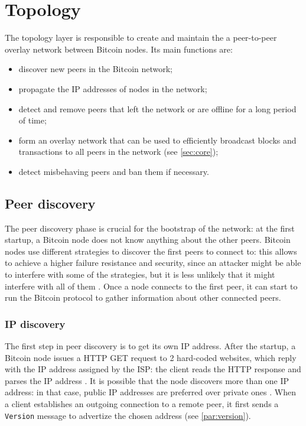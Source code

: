 \section{Topology}
\label{sec:topology}
The topology layer is responsible to create and maintain the a peer-to-peer overlay network between Bitcoin nodes.
Its main functions are:
\begin{itemize}
	\item discover new peers in the Bitcoin network;
	\item propagate the IP addresses of nodes in the network;
	\item detect and remove peers that left the network or are offline for a long period of time;
	\item form an overlay network that can be used to efficiently broadcast blocks and transactions to all peers in the network (see \cref{sec:core});
	\item detect misbehaving peers and ban them if necessary.
\end{itemize}

\subsection{Peer discovery}
\label{sub:discovery}
The peer discovery phase is crucial for the bootstrap of the network:
at the first startup, a Bitcoin node does not know anything about the other peers.
Bitcoin nodes use different strategies to discover the first peers to connect to:
this allows to achieve a higher failure resistance and security, since an attacker might be able to interfere with some of the strategies, but it is less unlikely that it might interfere with all of them \cite{bitcoin_peer_discovery}.
Once a node connects to the first peer, it can start to run the Bitcoin protocol to gather information about other connected peers.

\subsubsection{IP discovery}
The first step in peer discovery is to get its own IP address.
After the startup, a Bitcoin node issues a HTTP GET request to \num{2} hard-coded websites, which reply with the IP address assigned by the \ac{ISP}:
the client reads the HTTP response and parses the IP address \cite{bitcoin_peer_discovery}.
It is possible that the node discovers more than one IP address:
in that case, public IP addresses are preferred over private ones \cite{deanonymisation_2014}.
When a client establishes an outgoing connection to a remote peer, it first sends a \texttt{Version} message to advertize the chosen address (see \cref{par:version}).

